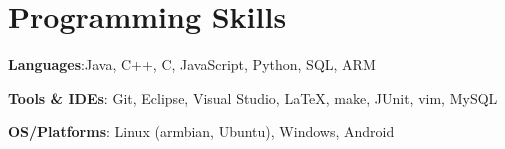 \documentclass[letterpaper,11pt]{article}
\newcommand{\resumeSubHeadingListStart}{\begin{itemize}[leftmargin=*]}
\newcommand{\resumeSubHeadingListEnd}{\end{itemize}}
\begin{document}
%
\section{Programming Skills}
 \resumeSubHeadingListStart
   \item{
     \textbf{Languages}{:Java, C++, C, JavaScript, Python, SQL, ARM} }
     \hfill
     \item{
      \textbf{Tools \& IDEs}{: Git, Eclipse, Visual Studio, \LaTeX, make, JUnit, vim, MySQL
   } 
\item{
	\textbf{OS/Platforms}{: Linux (armbian, Ubuntu), Windows, Android} }
	
} 
 \resumeSubHeadingListEnd
 
 
 
 
 


\end{document}
